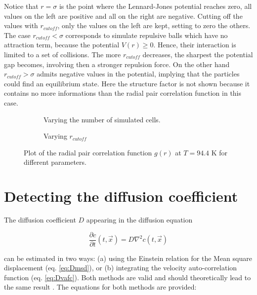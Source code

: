 \documentclass[12pt,english]{smfart}
\begin{document}
Notice that $r = \sigma$ is the point where the Lennard-Jones potential reaches zero, all values on the left are positive and all on the right are negative.
Cutting off the values with $r_{cutoff}$, only the values on the left are kept, setting to zero the others.
The case $r_{cutoff} < \sigma$ corresponds to simulate repulsive balls which have no attraction term, because the potential $V(r) \ge 0$. Hence, their interaction is limited to a set of collisions. The more $r_{cutoff}$ decreases, the sharpest the potential gap becomes, involving then a stronger repulsion force. 
On the other hand $r_{cutoff} > \sigma$ admits negative values in the potential, implying that the particles could find an equilibrium state. 
Here the structure factor is not shown because it contains no more informations than the radial pair correlation function in this case.

\begin{figure}
    \begin{subfigure}{0.5\textwidth}
        \resizebox{\textwidth}{!}{
            
        }
        \caption{Varying the number of simulated cells.}
        \label{step2_changeN-gofr}
    \end{subfigure}
    \begin{subfigure}{0.5\textwidth}
        \resizebox{\textwidth}{!}{
            
        }
        \caption{Varying $r_{cutoff}$}
        \label{step2_changeR-gofr}
    \end{subfigure}
    \caption{Plot of the radial pair correlation function $g(r)$ at $T = 94.4$ \si{K} for different parameters.}
\end{figure}


\section{Detecting the diffusion coefficient} \label{sec:diffusion}

The diffusion coefficient $D$ appearing in the diffusion equation \cite{course05}

\begin{equation}\label{eq:diffusion}
    \frac{\partial c}{\partial t}(t,\vec{x}) = D \nabla^2 c(t,\vec{x})
\end{equation}

can be estimated in two ways: (a) using the Einstein relation for the Mean square displacement (eq. \ref{eq:Dmsd}), or (b) integrating the velocity auto-correlation function (eq. \ref{eq:Dvafc}).
Both methods are valid and should theoretically lead to the same result \cite{course05}. The equations for both methods are provided:
\end{document}
